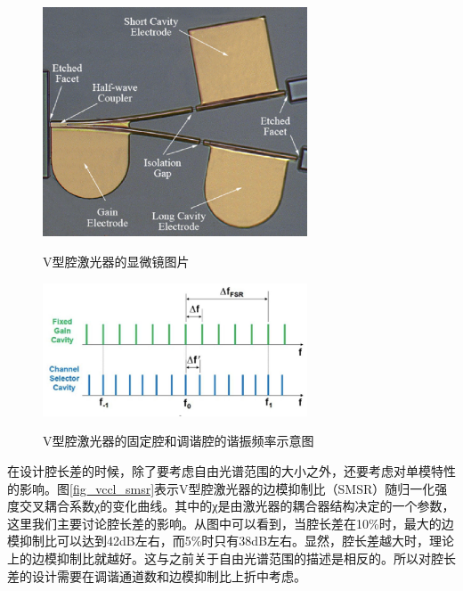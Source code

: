 \documentclass{ZJUthesis}
\begin{document}
\begin{figure}[!ht]
  \centering
  \includegraphics[width=0.7\textwidth]{./Pictures/vccl.eps}\\
  \caption{V型腔激光器的显微镜图片}
  \label{fig_vccl}
\end{figure}

\begin{figure}[!ht]
  \centering
  \includegraphics[width=0.7\textwidth]{./Pictures/vccl_f.eps}\\
  \caption{V型腔激光器的固定腔和调谐腔的谐振频率示意图}
  \label{fig_vccl_f}
\end{figure}

在设计腔长差的时候，除了要考虑自由光谱范围的大小之外，还要考虑对单模特性的影响。图\ref{fig_vccl_smsr}表示V型腔激光器的边模抑制比（SMSR）随归一化强度交叉耦合系数χ的变化曲线。其中的χ是由激光器的耦合器结构决定的一个参数，这里我们主要讨论腔长差的影响。从图中可以看到，当腔长差在10\%时，最大的边模抑制比可以达到42dB左右，而5\%时只有38dB左右。显然，腔长差越大时，理论上的边模抑制比就越好。这与之前关于自由光谱范围的描述是相反的。所以对腔长差的设计需要在调谐通道数和边模抑制比上折中考虑。
\end{document}
